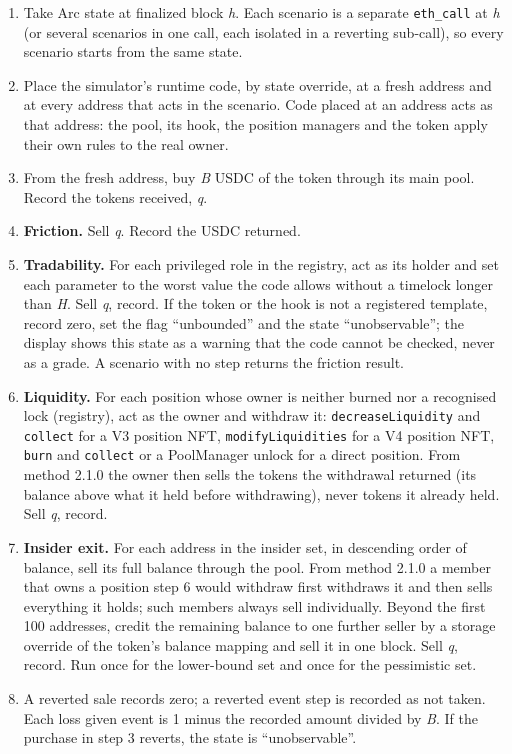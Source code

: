 \begin{enumerate}
\def\labelenumi{\arabic{enumi}.}
\tightlist
\item
  Take Arc state at finalized block \emph{h}. Each scenario is a separate \texttt{eth\_call} at \emph{h} (or several scenarios in one call, each isolated in a reverting sub-call), so every scenario starts from the same state.
\item
  Place the simulator's runtime code, by state override, at a fresh address and at every address that acts in the scenario. Code placed at an address acts as that address: the pool, its hook, the position managers and the token apply their own rules to the real owner.
\item
  From the fresh address, buy \emph{B} USDC of the token through its main pool. Record the tokens received, \emph{q}.
\item
  \textbf{Friction.} Sell \emph{q}. Record the USDC returned.
\item
  \textbf{Tradability.} For each privileged role in the registry, act as its holder and set each parameter to the worst value the code allows without a timelock longer than \emph{H}. Sell \emph{q}, record. If the token or the hook is not a registered template, record zero, set the flag ``unbounded'' and the state ``unobservable''; the display shows this state as a warning that the code cannot be checked, never as a grade. A scenario with no step returns the friction result.
\item
  \textbf{Liquidity.} For each position whose owner is neither burned nor a recognised lock (registry), act as the owner and withdraw it: \texttt{decreaseLiquidity} and \texttt{collect} for a V3 position NFT, \texttt{modifyLiquidities} for a V4 position NFT, \texttt{burn} and \texttt{collect} or a PoolManager unlock for a direct position. From method 2.1.0 the owner then sells the tokens the withdrawal returned (its balance above what it held before withdrawing), never tokens it already held. Sell \emph{q}, record.
\item
  \textbf{Insider exit.} For each address in the insider set, in descending order of balance, sell its full balance through the pool. From method 2.1.0 a member that owns a position step 6 would withdraw first withdraws it and then sells everything it holds; such members always sell individually. Beyond the first 100 addresses, credit the remaining balance to one further seller by a storage override of the token's balance mapping and sell it in one block. Sell \emph{q}, record. Run once for the lower-bound set and once for the pessimistic set.
\item
  A reverted sale records zero; a reverted event step is recorded as not taken. Each loss given event is 1 minus the recorded amount divided by \emph{B}. If the purchase in step 3 reverts, the state is ``unobservable''.
\end{enumerate}

